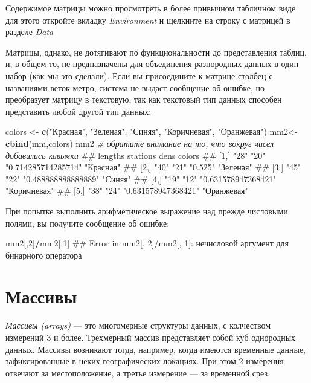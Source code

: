 \documentclass[]{book}
\newenvironment{Shaded}{\begin{snugshade}}{\end{snugshade}}
\newcommand{\KeywordTok}[1]{\textcolor[rgb]{0.13,0.29,0.53}{\textbf{#1}}}
\newcommand{\DecValTok}[1]{\textcolor[rgb]{0.00,0.00,0.81}{#1}}
\newcommand{\StringTok}[1]{\textcolor[rgb]{0.31,0.60,0.02}{#1}}
\newcommand{\CommentTok}[1]{\textcolor[rgb]{0.56,0.35,0.01}{\textit{#1}}}
\newcommand{\OperatorTok}[1]{\textcolor[rgb]{0.81,0.36,0.00}{\textbf{#1}}}
\newcommand{\NormalTok}[1]{#1}
\begin{document}
Содержимое матрицы можно просмотреть в более привычном табличном виде
для этого откройте вкладку \emph{Environment} и щелкните на строку с
матрицей в разделе \emph{Data}

Матрицы, однако, не дотягивают по функциональности до представления
таблиц, и, в общем-то, не предназначены для объединения разнородных
данных в один набор (как мы это сделали). Если вы присоедините к матрице
столбец с названиями веток метро, система не выдаст сообщение об ошибке,
но преобразует матрицу в текстовую, так как текстовый тип данных
способен представить любой другой тип данных:

\begin{Shaded}
\begin{Highlighting}[]
\NormalTok{colors <-}\StringTok{ }\KeywordTok{c}\NormalTok{(}\StringTok{"Красная"}\NormalTok{, }\StringTok{"Зеленая"}\NormalTok{, }\StringTok{"Синяя"}\NormalTok{, }\StringTok{"Коричневая"}\NormalTok{, }\StringTok{"Оранжевая"}\NormalTok{)}
\NormalTok{mm2<-}\KeywordTok{cbind}\NormalTok{(mm,colors)}
\NormalTok{mm2  }\CommentTok{# обратите внимание на то, что вокруг чисел добавились кавычки}
\NormalTok{##      lengths stations dens                colors      }
\NormalTok{## [1,] "28"    "20"     "0.714285714285714" "Красная"   }
\NormalTok{## [2,] "40"    "21"     "0.525"             "Зеленая"   }
\NormalTok{## [3,] "45"    "22"     "0.488888888888889" "Синяя"     }
\NormalTok{## [4,] "19"    "12"     "0.631578947368421" "Коричневая"}
\NormalTok{## [5,] "38"    "24"     "0.631578947368421" "Оранжевая"}
\end{Highlighting}
\end{Shaded}

При попытке выполнить арифметическое выражение над прежде числовыми
полями, вы получите сообщение об ошибке:

\begin{Shaded}
\begin{Highlighting}[]
\NormalTok{mm2[,}\DecValTok{2}\NormalTok{]}\OperatorTok{/}\NormalTok{mm2[,}\DecValTok{1}\NormalTok{]}
\NormalTok{## Error in mm2[, 2]/mm2[, 1]: нечисловой аргумент для бинарного оператора}
\end{Highlighting}
\end{Shaded}

\section{Массивы}\label{arrays}

\emph{Массивы (arrays)} --- это многомерные структуры данных, с
колчеством измерений 3 и более. Трехмерный массив представляет собой куб
однородных данных. Массивы возникают тогда, например, когда имеются
временные данные, зафиксированные в неких географических локациях. При
этом 2 измерения отвечают за местоположение, а третье измерение --- за
временной срез.
\end{document}
